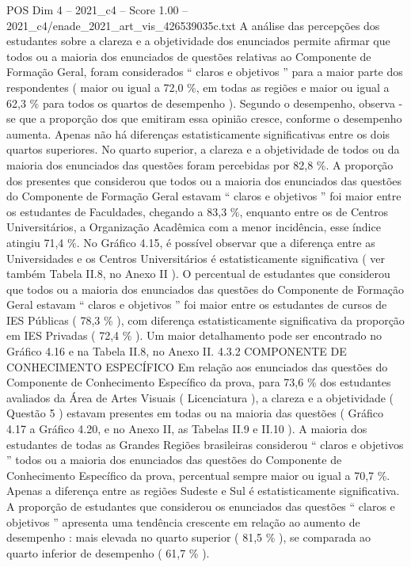 \begin{textsample}{POS Dim 4 – 2021\_c4 – Score 1.00 – 2021\_c4/enade\_2021\_art\_vis\_426539035c.txt}
A análise das percepções dos estudantes sobre a clareza e a objetividade dos enunciados permite afirmar que todos ou a maioria dos enunciados de questões relativas ao Componente de Formação Geral, foram considerados “ claros e objetivos ” para a maior parte dos respondentes ( maior ou igual a 72,0 \%, em todas as regiões e maior ou igual a 62,3 \% para todos os quartos de desempenho ).
Segundo o desempenho, observa -se que a proporção dos que emitiram essa opinião cresce, conforme o desempenho aumenta.
Apenas não há diferenças estatisticamente significativas entre os dois quartos superiores.
No quarto superior, a clareza e a objetividade de todos ou da maioria dos enunciados das questões foram percebidas por 82,8 \%.
A proporção dos presentes que considerou que todos ou a maioria dos enunciados das questões do Componente de Formação Geral estavam “ claros e objetivos ” foi maior entre os estudantes de Faculdades, chegando a 83,3 \%, enquanto entre os de Centros Universitários, a Organização Acadêmica com a menor incidência, esse índice atingiu 71,4 \%.
No Gráfico 4.15, é possível observar que a diferença entre as Universidades e os Centros Universitários é estatisticamente significativa ( ver também Tabela II.8, no Anexo II ).
O percentual de estudantes que considerou que todos ou a maioria dos enunciados das questões do Componente de Formação Geral estavam “ claros e objetivos ” foi maior entre os estudantes de cursos de IES Públicas ( 78,3 \% ), com diferença estatisticamente significativa da proporção em IES Privadas ( 72,4 \% ).
Um maior detalhamento pode ser encontrado no Gráfico 4.16 e na Tabela II.8, no Anexo II. 4.3.2 COMPONENTE DE CONHECIMENTO ESPECÍFICO Em relação aos enunciados das questões do Componente de Conhecimento Específico da prova, para 73,6 \% dos estudantes avaliados da Área de Artes Visuais ( Licenciatura ), a clareza e a objetividade ( Questão 5 ) estavam presentes em todas ou na maioria das questões ( Gráfico 4.17 a Gráfico 4.20, e no Anexo II, as Tabelas II.9 e II.10 ).
A maioria dos estudantes de todas as Grandes Regiões brasileiras considerou “ claros e objetivos ” todos ou a maioria dos enunciados das questões do Componente de Conhecimento Específico da prova, percentual sempre maior ou igual a 70,7 \%.
Apenas a diferença entre as regiões Sudeste e Sul é estatisticamente significativa.
A proporção de estudantes que considerou os enunciados das questões “ claros e objetivos ” apresenta uma tendência crescente em relação ao aumento de desempenho : mais elevada no quarto superior ( 81,5 \% ), se comparada ao quarto inferior de desempenho ( 61,7 \% ).

\end{textsample}
